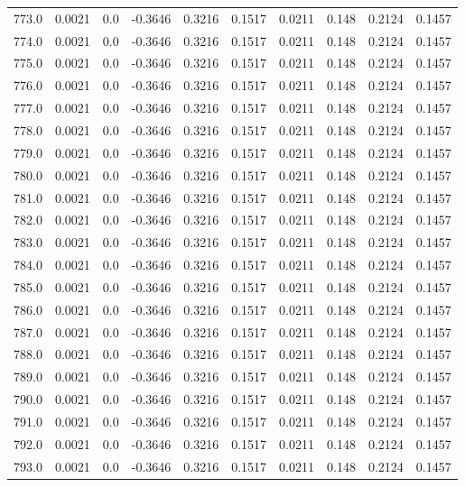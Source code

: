 \begin{longtable}{lrrrrrrrrr}
773.0 & 0.0021 & 0.0 & -0.3646 & 0.3216 & 0.1517 & 0.0211 & 0.148 & 0.2124 & 0.1457 \\
774.0 & 0.0021 & 0.0 & -0.3646 & 0.3216 & 0.1517 & 0.0211 & 0.148 & 0.2124 & 0.1457 \\
775.0 & 0.0021 & 0.0 & -0.3646 & 0.3216 & 0.1517 & 0.0211 & 0.148 & 0.2124 & 0.1457 \\
776.0 & 0.0021 & 0.0 & -0.3646 & 0.3216 & 0.1517 & 0.0211 & 0.148 & 0.2124 & 0.1457 \\
777.0 & 0.0021 & 0.0 & -0.3646 & 0.3216 & 0.1517 & 0.0211 & 0.148 & 0.2124 & 0.1457 \\
778.0 & 0.0021 & 0.0 & -0.3646 & 0.3216 & 0.1517 & 0.0211 & 0.148 & 0.2124 & 0.1457 \\
779.0 & 0.0021 & 0.0 & -0.3646 & 0.3216 & 0.1517 & 0.0211 & 0.148 & 0.2124 & 0.1457 \\
780.0 & 0.0021 & 0.0 & -0.3646 & 0.3216 & 0.1517 & 0.0211 & 0.148 & 0.2124 & 0.1457 \\
781.0 & 0.0021 & 0.0 & -0.3646 & 0.3216 & 0.1517 & 0.0211 & 0.148 & 0.2124 & 0.1457 \\
782.0 & 0.0021 & 0.0 & -0.3646 & 0.3216 & 0.1517 & 0.0211 & 0.148 & 0.2124 & 0.1457 \\
783.0 & 0.0021 & 0.0 & -0.3646 & 0.3216 & 0.1517 & 0.0211 & 0.148 & 0.2124 & 0.1457 \\
784.0 & 0.0021 & 0.0 & -0.3646 & 0.3216 & 0.1517 & 0.0211 & 0.148 & 0.2124 & 0.1457 \\
785.0 & 0.0021 & 0.0 & -0.3646 & 0.3216 & 0.1517 & 0.0211 & 0.148 & 0.2124 & 0.1457 \\
786.0 & 0.0021 & 0.0 & -0.3646 & 0.3216 & 0.1517 & 0.0211 & 0.148 & 0.2124 & 0.1457 \\
787.0 & 0.0021 & 0.0 & -0.3646 & 0.3216 & 0.1517 & 0.0211 & 0.148 & 0.2124 & 0.1457 \\
788.0 & 0.0021 & 0.0 & -0.3646 & 0.3216 & 0.1517 & 0.0211 & 0.148 & 0.2124 & 0.1457 \\
789.0 & 0.0021 & 0.0 & -0.3646 & 0.3216 & 0.1517 & 0.0211 & 0.148 & 0.2124 & 0.1457 \\
790.0 & 0.0021 & 0.0 & -0.3646 & 0.3216 & 0.1517 & 0.0211 & 0.148 & 0.2124 & 0.1457 \\
791.0 & 0.0021 & 0.0 & -0.3646 & 0.3216 & 0.1517 & 0.0211 & 0.148 & 0.2124 & 0.1457 \\
792.0 & 0.0021 & 0.0 & -0.3646 & 0.3216 & 0.1517 & 0.0211 & 0.148 & 0.2124 & 0.1457 \\
793.0 & 0.0021 & 0.0 & -0.3646 & 0.3216 & 0.1517 & 0.0211 & 0.148 & 0.2124 & 0.1457 \\

\end{longtable}
